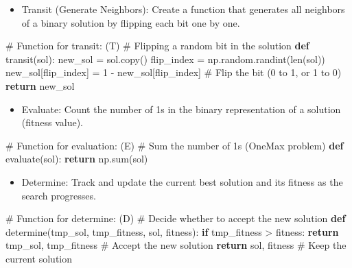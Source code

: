 \documentclass[
  letterpaper,
  DIV=11,
  numbers=noendperiod]{scrreprt}
\newenvironment{Shaded}{\begin{snugshade}}{\end{snugshade}}
\newcommand{\BuiltInTok}[1]{\textcolor[rgb]{0.00,0.23,0.31}{#1}}
\newcommand{\CommentTok}[1]{\textcolor[rgb]{0.37,0.37,0.37}{#1}}
\newcommand{\ControlFlowTok}[1]{\textcolor[rgb]{0.00,0.23,0.31}{\textbf{#1}}}
\newcommand{\DecValTok}[1]{\textcolor[rgb]{0.68,0.00,0.00}{#1}}
\newcommand{\KeywordTok}[1]{\textcolor[rgb]{0.00,0.23,0.31}{\textbf{#1}}}
\newcommand{\NormalTok}[1]{\textcolor[rgb]{0.00,0.23,0.31}{#1}}
\newcommand{\OperatorTok}[1]{\textcolor[rgb]{0.37,0.37,0.37}{#1}}
\providecommand{\tightlist}{%
  \setlength{\itemsep}{0pt}\setlength{\parskip}{0pt}}\usepackage{longtable,booktabs,array}
\begin{document}
\begin{itemize}
\tightlist
\item
  Transit (Generate Neighbors): Create a function that generates all
  neighbors of a binary solution by flipping each bit one by one.
\end{itemize}

\begin{Shaded}
\begin{Highlighting}[]
\CommentTok{\# Function for transit: (T) }
\CommentTok{\# Flipping a random bit in the solution}
\KeywordTok{def}\NormalTok{ transit(sol):}
\NormalTok{    new\_sol }\OperatorTok{=}\NormalTok{ sol.copy()}
\NormalTok{    flip\_index }\OperatorTok{=}\NormalTok{ np.random.randint(}\BuiltInTok{len}\NormalTok{(sol))}
\NormalTok{    new\_sol[flip\_index] }\OperatorTok{=} \DecValTok{1} \OperatorTok{{-}}\NormalTok{ new\_sol[flip\_index]  }\CommentTok{\# Flip the bit (0 to 1, or 1 to 0)}
    \ControlFlowTok{return}\NormalTok{ new\_sol}
\end{Highlighting}
\end{Shaded}

\begin{itemize}
\tightlist
\item
  Evaluate: Count the number of 1s in the binary representation of a
  solution (fitness value).
\end{itemize}

\begin{Shaded}
\begin{Highlighting}[]
\CommentTok{\# Function for evaluation: (E) }
\CommentTok{\# Sum the number of 1s (OneMax problem)}
\KeywordTok{def}\NormalTok{ evaluate(sol):}
    \ControlFlowTok{return}\NormalTok{ np.}\BuiltInTok{sum}\NormalTok{(sol)}
\end{Highlighting}
\end{Shaded}

\begin{itemize}
\tightlist
\item
  Determine: Track and update the current best solution and its fitness
  as the search progresses.
\end{itemize}

\begin{Shaded}
\begin{Highlighting}[]
\CommentTok{\# Function for determine: (D) }
\CommentTok{\# Decide whether to accept the new solution}
\KeywordTok{def}\NormalTok{ determine(tmp\_sol, tmp\_fitness, sol, fitness):}
    \ControlFlowTok{if}\NormalTok{ tmp\_fitness }\OperatorTok{\textgreater{}}\NormalTok{ fitness:}
        \ControlFlowTok{return}\NormalTok{ tmp\_sol, tmp\_fitness  }\CommentTok{\# Accept the new solution}
    \ControlFlowTok{return}\NormalTok{ sol, fitness  }\CommentTok{\# Keep the current solution}
\end{Highlighting}
\end{Shaded}
\end{document}
